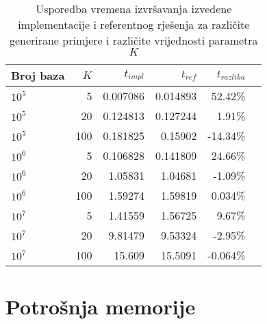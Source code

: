 \documentclass[times, utf8, seminar, numeric]{fer}
\begin{document}
\begin{table}[h]
	\centering
	\caption{Usporedba vremena izvršavanja izvedene implementacije i referentnog rješenja za različite generirane primjere i različite vrijednosti parametra $K$}
	\label{tbl:time-generated}
	
	\begin{tabular}{lrrrrr}
		\hline
        Broj baza & $K$ & $t_{impl}$ & $t_{ref}$ & $t_{razlika}$ \\ \hline
        $10^5$ & 5 & 0.007086 & 0.014893 & 52.42\% \\
        $10^5$ & 20 & 0.124813 & 0.127244 & 1.91\% \\
        $10^5$ & 100 & 0.181825 & 0.15902 & -14.34\% \\ \hline
        $10^6$ & 5 & 0.106828 & 0.141809 & 24.66\% \\
        $10^6$ & 20 & 1.05831 & 1.04681 & -1.09\% \\
        $10^6$ & 100 & 1.59274 & 1.59819 & 0.034\% \\ \hline
        $10^7$ & 5 & 1.41559 & 1.56725 & 9.67\% \\
        $10^7$ & 20 & 9.81479 & 9.53324 & -2.95\% \\
        $10^7$ & 100 & 15.609 & 15.5091 & -0.064\% \\
    \hline
	\end{tabular}
\end{table}

\section{Potrošnja memorije}
\end{document}
